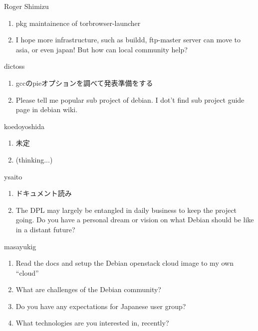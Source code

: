 \begin{prework}{ Roger Shimizu }
  \begin{enumerate}
  \item pkg maintainence of torbrowser-launcher
  \item I hope more infrastructure, such as buildd, ftp-master server can move to asia, or even japan! But how can local community help?
  \end{enumerate}
\end{prework}

\begin{prework}{ dictoss }
  \begin{enumerate}
  \item gccのpieオプションを調べて発表準備をする
  \item Please tell me popular sub project of debian. I dot't find sub project guide page in debian wiki.
  \end{enumerate}
\end{prework}

\begin{prework}{ koedoyoshida }
  \begin{enumerate}
  \item 未定
  \item (thinking...)
  \end{enumerate}
\end{prework}

\begin{prework}{ ysaito }
  \begin{enumerate}
  \item ドキュメント読み
  \item The DPL may largely be entangled in daily business to keep the project going. Do you have a personal dream or vision on what Debian should be like in a distant future?
  \end{enumerate}
\end{prework}

\begin{prework}{ masayukig }
  \begin{enumerate}
  \item Read the docs and setup the Debian openstack cloud image to my own ``cloud''
  \item What are challenges of the Debian community?
  \item Do you have any expectations for Japanese user group?
  \item What technologies are you interested in, recently?
  \end{enumerate}
\end{prework}

